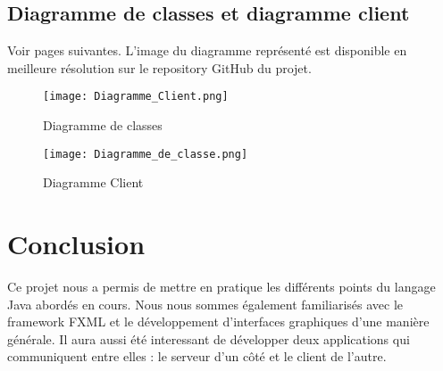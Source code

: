 \documentclass[11pt]{article}
\begin{document}
    \subsection{Diagramme de classes et diagramme client}

    Voir pages suivantes.
    L'image du diagramme représenté est disponible en meilleure résolution sur le repository GitHub du projet.\citep{jmessengerbecartgourmelon}

    \begin{figure}[!h]
        \centering
        \centerline{\texttt{[image: Diagramme\_Client.png]}}
        \caption{Diagramme de classes}
        \label{fig:diagClasses}
    \end{figure}

    \begin{figure}[!h]
        \centering
        \centerline{\texttt{[image: Diagramme\_de\_classe.png]}}
        \caption{Diagramme Client}
        \label{fig:diagClient}
    \end{figure}

    \section{Conclusion}

    Ce projet nous a permis de mettre en pratique les différents points du langage Java abordés en cours.
    Nous nous sommes également familiarisés avec le framework FXML et le développement d'interfaces graphiques d'une manière générale. Il aura aussi été interessant de développer deux applications qui communiquent entre elles : le serveur d'un côté et le client de l'autre.



    
    
\end{document}
